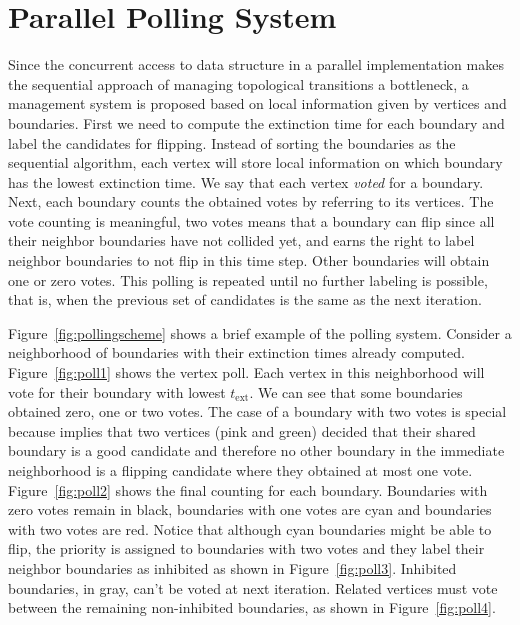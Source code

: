 \section{Parallel Polling System}

Since the concurrent access to data structure in a parallel implementation makes the sequential approach of managing topological transitions a bottleneck, a management system is proposed based on local information given by vertices and boundaries. 
First we need to compute the extinction time for each boundary and label the candidates for flipping. 
Instead of sorting the boundaries as the sequential algorithm, each vertex will store local information on which boundary has the lowest extinction time. 
We say that each vertex \emph{voted} for a boundary. 
Next, each boundary counts the obtained votes by referring to its vertices. 
The vote counting is meaningful, two votes means that a boundary can flip since all their neighbor boundaries have not collided yet, and earns the right to label neighbor boundaries to not flip in this time step. 
Other boundaries will obtain one or zero votes.
This polling is repeated until no further labeling is possible, that is, when the previous set of candidates is the same as the next iteration.

Figure~\ref{fig:pollingscheme} shows a brief example of the polling system. 
Consider a neighborhood of boundaries with their extinction times already computed. Figure~\ref{fig:poll1} shows the vertex poll. 
Each vertex in this neighborhood will vote for their boundary with lowest $t_{\text{ext}}$. 
We can see that some boundaries obtained zero, one or two votes. 
The case of a boundary with two votes is special because implies that two vertices (pink and green) decided that their shared boundary is a good candidate and therefore no other boundary in the immediate neighborhood is a flipping candidate where they obtained at most one vote. Figure~\ref{fig:poll2} shows the final counting for each boundary. 
Boundaries with zero votes remain in black, boundaries with one votes are cyan and boundaries with two votes are red. Notice that although cyan boundaries might be able to flip, the priority is assigned to boundaries with two votes and they label their neighbor boundaries as inhibited as shown in Figure~\ref{fig:poll3}. 
Inhibited boundaries, in gray, can't be voted at next iteration. 
Related vertices must vote between the remaining non-inhibited boundaries, as shown in Figure~\ref{fig:poll4}.

